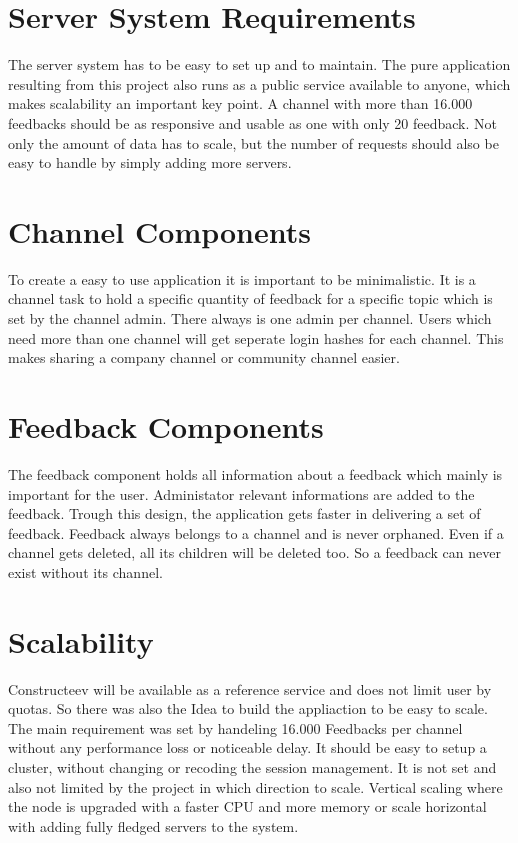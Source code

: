 \section{Server System Requirements}
The server system has to be easy to set up and to maintain. The pure application resulting from this project also runs as a public service available to anyone, which makes scalability an important key point. A channel with more than 16.000 feedbacks should be as responsive and usable as one with only 20 feedback. 
Not only the amount of data has to scale, but the number of requests should also be easy to handle by simply adding more servers. 

\section{Channel Components}
To create a easy to use application it is important to be minimalistic.  It is a channel task to hold a specific quantity of feedback for a specific topic which is set by the channel admin. There always is one admin per channel. Users which need more than one channel will get seperate login hashes for each channel. This makes sharing a company channel or community channel easier. 

\section{Feedback Components}
The feedback component holds all information about a feedback which mainly is important for the user. Administator relevant informations are added to the feedback. Trough this design, the application gets faster in delivering a set of feedback. Feedback always belongs to a channel and is never orphaned. Even if a channel gets deleted, all its children will be deleted too. So a feedback can never exist without its channel.

\section{Scalability}
Constructeev will be available as a reference service and does not limit user by quotas. So there was also the Idea to build the appliaction to be easy to scale. The main requirement was set by handeling 16.000 Feedbacks per channel without any performance loss or noticeable delay. It should be easy to setup a cluster, without changing or recoding the session management. It is not set and also not limited by the project in which direction to scale. Vertical scaling where the node is upgraded with a faster CPU and more memory or scale horizontal with adding fully fledged servers to the system.

